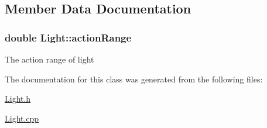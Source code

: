 \subsection{Member Data Documentation}
\hypertarget{classLight_ada425b10c6d859e3348165267f19d752}{
\subsubsection[{action\-Range}]{\setlength{\rightskip}{0pt plus 5cm}double Light\-::action\-Range\hspace{0.3cm}{\ttfamily [private]}}}\label{classLight_ada425b10c6d859e3348165267f19d752}
The action range of light 

The documentation for this class was generated from the following files\-:\begin{DoxyCompactItemize}
\item 
\hyperlink{Light_8h}{Light.\-h}\item 
\hyperlink{Light_8cpp}{Light.\-cpp}\end{DoxyCompactItemize}
